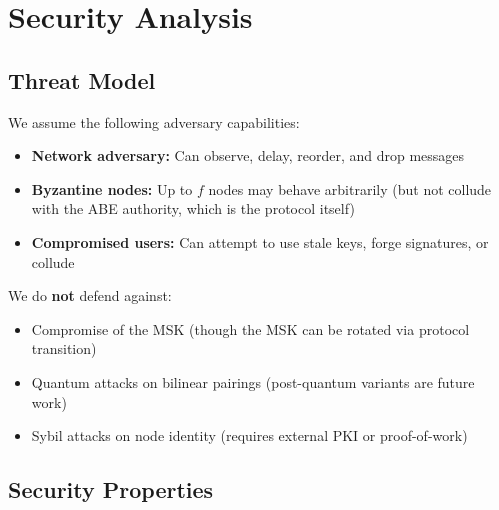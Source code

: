 \documentclass[sigconf,nonacm]{acmart}
\begin{document}
\section{Security Analysis}

\subsection{Threat Model}

We assume the following adversary capabilities:

\begin{itemize}
    \item \textbf{Network adversary:} Can observe, delay, reorder, and drop messages
    \item \textbf{Byzantine nodes:} Up to $f$ nodes may behave arbitrarily (but not collude with the ABE authority, which is the protocol itself)
    \item \textbf{Compromised users:} Can attempt to use stale keys, forge signatures, or collude
\end{itemize}

We do \textbf{not} defend against:

\begin{itemize}
    \item Compromise of the MSK (though the MSK can be rotated via protocol transition)
    \item Quantum attacks on bilinear pairings (post-quantum variants are future work)
    \item Sybil attacks on node identity (requires external PKI or proof-of-work)
\end{itemize}

\subsection{Security Properties}
\end{document}
